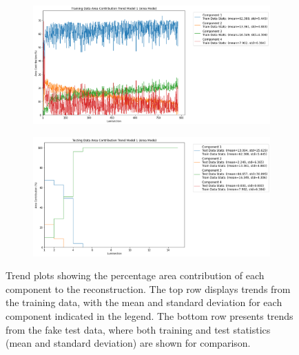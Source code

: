 \begin{figure}[H]
    \centering
    \begin{subfigure}[t]{1\textwidth}
        \centering
        \includegraphics[width=\textwidth]{images/trend_train.png}
    \end{subfigure}
    \hfill
    \begin{subfigure}[t]{1\textwidth}
        \centering
        \includegraphics[width=\textwidth]{images/trend_fake.png}
    \end{subfigure}
    \caption{Trend plots showing the percentage area contribution of each component to the reconstruction. The top row displays trends from the training data, with the mean and standard deviation for each component indicated in the legend. The bottom row presents trends from the fake test data, where both training and test statistics (mean and standard deviation) are shown for comparison.}
    \label{fig:trend_plots}
\end{figure}

